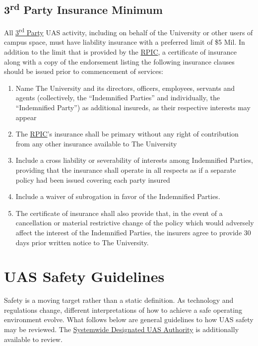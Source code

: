 \documentclass[
]{book}
\providecommand{\tightlist}{%
  \setlength{\itemsep}{0pt}\setlength{\parskip}{0pt}}
\begin{document}
\hypertarget{rd-party-insurance-minimum}{%
\section{\texorpdfstring{3\textsuperscript{rd} Party Insurance Minimum}{3rd Party Insurance Minimum}}\label{rd-party-insurance-minimum}}

All \protect\hyperlink{rdparty}{3\textsuperscript{rd} Party} UAS activity, including on behalf of the University or other users of campus space, must have liability insurance with a preferred limit of \$5 Mil. In addition to the limit that is provided by the \protect\hyperlink{RPIC}{RPIC}, a certificate of insurance along with a copy of the endorsement listing the following insurance clauses should be issued prior to commencement of services:

\begin{enumerate}
\def\labelenumi{\arabic{enumi}.}
\tightlist
\item
  Name The University and its directors, officers, employees, servants and agents (collectively, the ``Indemnified Parties'' and individually, the ``Indemnified Party'') as additional insureds, as their respective interests may appear
\item
  The \protect\hyperlink{RPIC}{RPIC}'s insurance shall be primary without any right of contribution from any other insurance available to The University
\item
  Include a cross liability or severability of interests among Indemnified Parties, providing that the insurance shall operate in all respects as if a separate policy had been issued covering each party insured
\item
  Include a waiver of subrogation in favor of the Indemnified Parties.
\item
  The certificate of insurance shall also provide that, in the event of a cancellation or material restrictive change of the policy which would adversely affect the interest of the Indemnified Parties, the insurers agree to provide 30 days prior written notice to The University.
\end{enumerate}

\hypertarget{ch-UAS-safety}{%
\chapter{UAS Safety Guidelines}\label{ch-UAS-safety}}

Safety is a moving target rather than a static definition. As technology and regulations change, different interpretations of how to achieve a safe operating environment evolve. What follows below are general guidelines to how UAS safety may be reviewed. The \protect\hyperlink{SDA}{Systemwide Designated UAS Authority} is additionally available to review.
\end{document}
